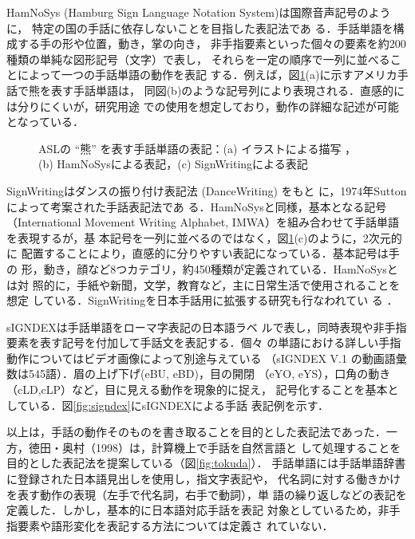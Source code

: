 HamNoSys (Hamburg Sign Language Notation System)は国際音声記号のように，
特定の国の手話に依存しないことを目指した表記法であ
る\cite{Prillwitz2004}．手話単語を構成する手の形や位置，動き，掌の向き，
非手指要素といった個々の要素を約200種類の単純な図形記号（文字）で表し，
それらを一定の順序で一列に並べることによって一つの手話単語の動作を表記
する．例えば，図\ref{fig:bear}(a)に示すアメリカ手話で熊を表す手話単語は，
同図(b)のような記号列により表現される．直感的には分りにくいが，研究用途
での使用を想定しており，動作の詳細な記述が可能となっている．
\begin{figure}
  \centering
  \epsfxsize=10cm
  \caption{ASLの ``熊'' を表す手話単語の表記：(a) イラストによる描写
    \cite{Fant1994}，\\(b) HamNoSysによる表記\cite{Bentele1999}，(c)
    SignWritingによる表記\\\cite{Sutton2006}}
  \label{fig:bear}
\end{figure}

SignWritingはダンスの振り付け表記法 (DanceWriting) をもと
に，1974年Suttonによって考案された手話表記法であ
る\cite{Sutton2002}．HamNoSysと同様，基本となる記号（International
Movement Writing Alphabet, IMWA）を組み合わせて手話単語を表現するが，基
本記号を一列に並べるのではなく，図\ref{fig:bear}(c)のように，2次元的に
配置することにより，直感的に分りやすい表記になっている．基本記号は手の
形，動き，顔など8つカテゴリ，約450種類が定義されている．HamNoSysとは対
照的に，手紙や新聞，文学，教育など，主に日常生活で使用されることを想定
している．SignWritingを日本手話用に拡張する研究も行なわれてい
る\cite{Honna1990} ．

sIGNDEX\cite{Ichikawa2001,SILE2005}は手話単語をローマ字表記の日本語ラベ
ルで表し，同時表現や非手指要素を表す記号を付加して手話文を表記する．個々
の単語における詳しい手指動作についてはビデオ画像によって別途与えている
（sIGNDEX V.1 の動画語彙数は545語）．眉の上げ下げ(eBU, eBD)，目の開閉
（eYO, eYS），口角の動き（cLD,cLP）など，目に見える動作を現象的に捉え，
記号化することを基本としている．図\ref{fig:signdex}にsIGNDEXによる手話
表記例を示す．


以上は，手話の動作そのものを書き取ることを目的とした表記法であった．一
方，徳田・奥村（1998）\nocite{Tokuda1998}は，計算機上で手話を自然言語と
して処理することを目的とした表記法を提案している（図\ref{fig:tokuda}）．
手話単語には手話単語辞書に登録された日本語見出しを使用し，指文字表記や，
代名詞に対する働きかけを表す動作の表現（左手で代名詞，右手で動詞），単
語の繰り返しなどの表記を定義した．しかし，基本的に日本語対応手話を表記
対象としているため，非手指要素や語形変化を表記する方法については定義さ
れていない．

